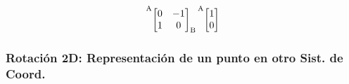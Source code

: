 \begin{frame}
\begin{center}
\begin{minipage}{0.5\linewidth}
{\begin{align*}
                    \toCoord{\fromCoord{\begin{bmatrix}
                        0 & -1 \\
                        1 & 0
                    \end{bmatrix}}{B}}{A}
                    \toCoord{\begin{bmatrix}
                        1\\
                        0
                    \end{bmatrix}}{A}
                \end{align*}                
            }
        \end{minipage}
    \end{center}
\end{frame}


\begin{frame}
    \frametitle{Rotación 2D: Representación de un punto en otro Sist. de Coord.}
    
    \centering
    

\end{frame}
